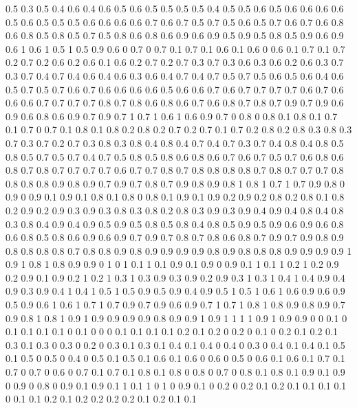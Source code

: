 0.5 0.3
0.5 0.4
0.6 0.4
0.6 0.5
0.6 0.5
0.5 0.5
0.5 0.4
0.5 0.5
0.6 0.5
0.6 0.6
0.6 0.6
0.5 0.6
0.5 0.5
0.5 0.6
0.6 0.6
0.6 0.7
0.6 0.7
0.5 0.7
0.5 0.6
0.5 0.7
0.6 0.7
0.6 0.8
0.6 0.8
0.5 0.8
0.5 0.7
0.5 0.8
0.6 0.8
0.6 0.9
0.6 0.9
0.5 0.9
0.5 0.8
0.5 0.9
0.6 0.9
0.6 1
0.6 1
0.5 1
0.5 0.9
0.6 0
0.7 0
0.7 0.1
0.7 0.1
0.6 0.1
0.6 0
0.6 0.1
0.7 0.1
0.7 0.2
0.7 0.2
0.6 0.2
0.6 0.1
0.6 0.2
0.7 0.2
0.7 0.3
0.7 0.3
0.6 0.3
0.6 0.2
0.6 0.3
0.7 0.3
0.7 0.4
0.7 0.4
0.6 0.4
0.6 0.3
0.6 0.4
0.7 0.4
0.7 0.5
0.7 0.5
0.6 0.5
0.6 0.4
0.6 0.5
0.7 0.5
0.7 0.6
0.7 0.6
0.6 0.6
0.6 0.5
0.6 0.6
0.7 0.6
0.7 0.7
0.7 0.7
0.6 0.7
0.6 0.6
0.6 0.7
0.7 0.7
0.7 0.8
0.7 0.8
0.6 0.8
0.6 0.7
0.6 0.8
0.7 0.8
0.7 0.9
0.7 0.9
0.6 0.9
0.6 0.8
0.6 0.9
0.7 0.9
0.7 1
0.7 1
0.6 1
0.6 0.9
0.7 0
0.8 0
0.8 0.1
0.8 0.1
0.7 0.1
0.7 0
0.7 0.1
0.8 0.1
0.8 0.2
0.8 0.2
0.7 0.2
0.7 0.1
0.7 0.2
0.8 0.2
0.8 0.3
0.8 0.3
0.7 0.3
0.7 0.2
0.7 0.3
0.8 0.3
0.8 0.4
0.8 0.4
0.7 0.4
0.7 0.3
0.7 0.4
0.8 0.4
0.8 0.5
0.8 0.5
0.7 0.5
0.7 0.4
0.7 0.5
0.8 0.5
0.8 0.6
0.8 0.6
0.7 0.6
0.7 0.5
0.7 0.6
0.8 0.6
0.8 0.7
0.8 0.7
0.7 0.7
0.7 0.6
0.7 0.7
0.8 0.7
0.8 0.8
0.8 0.8
0.7 0.8
0.7 0.7
0.7 0.8
0.8 0.8
0.8 0.9
0.8 0.9
0.7 0.9
0.7 0.8
0.7 0.9
0.8 0.9
0.8 1
0.8 1
0.7 1
0.7 0.9
0.8 0
0.9 0
0.9 0.1
0.9 0.1
0.8 0.1
0.8 0
0.8 0.1
0.9 0.1
0.9 0.2
0.9 0.2
0.8 0.2
0.8 0.1
0.8 0.2
0.9 0.2
0.9 0.3
0.9 0.3
0.8 0.3
0.8 0.2
0.8 0.3
0.9 0.3
0.9 0.4
0.9 0.4
0.8 0.4
0.8 0.3
0.8 0.4
0.9 0.4
0.9 0.5
0.9 0.5
0.8 0.5
0.8 0.4
0.8 0.5
0.9 0.5
0.9 0.6
0.9 0.6
0.8 0.6
0.8 0.5
0.8 0.6
0.9 0.6
0.9 0.7
0.9 0.7
0.8 0.7
0.8 0.6
0.8 0.7
0.9 0.7
0.9 0.8
0.9 0.8
0.8 0.8
0.8 0.7
0.8 0.8
0.9 0.8
0.9 0.9
0.9 0.9
0.8 0.9
0.8 0.8
0.8 0.9
0.9 0.9
0.9 1
0.9 1
0.8 1
0.8 0.9
0.9 0
1 0
1 0.1
1 0.1
0.9 0.1
0.9 0
0.9 0.1
1 0.1
1 0.2
1 0.2
0.9 0.2
0.9 0.1
0.9 0.2
1 0.2
1 0.3
1 0.3
0.9 0.3
0.9 0.2
0.9 0.3
1 0.3
1 0.4
1 0.4
0.9 0.4
0.9 0.3
0.9 0.4
1 0.4
1 0.5
1 0.5
0.9 0.5
0.9 0.4
0.9 0.5
1 0.5
1 0.6
1 0.6
0.9 0.6
0.9 0.5
0.9 0.6
1 0.6
1 0.7
1 0.7
0.9 0.7
0.9 0.6
0.9 0.7
1 0.7
1 0.8
1 0.8
0.9 0.8
0.9 0.7
0.9 0.8
1 0.8
1 0.9
1 0.9
0.9 0.9
0.9 0.8
0.9 0.9
1 0.9
1 1
1 1
0.9 1
0.9 0.9
0 0
0.1 0
0.1 0.1
0.1 0.1
0 0.1
0 0
0 0.1
0.1 0.1
0.1 0.2
0.1 0.2
0 0.2
0 0.1
0 0.2
0.1 0.2
0.1 0.3
0.1 0.3
0 0.3
0 0.2
0 0.3
0.1 0.3
0.1 0.4
0.1 0.4
0 0.4
0 0.3
0 0.4
0.1 0.4
0.1 0.5
0.1 0.5
0 0.5
0 0.4
0 0.5
0.1 0.5
0.1 0.6
0.1 0.6
0 0.6
0 0.5
0 0.6
0.1 0.6
0.1 0.7
0.1 0.7
0 0.7
0 0.6
0 0.7
0.1 0.7
0.1 0.8
0.1 0.8
0 0.8
0 0.7
0 0.8
0.1 0.8
0.1 0.9
0.1 0.9
0 0.9
0 0.8
0 0.9
0.1 0.9
0.1 1
0.1 1
0 1
0 0.9
0.1 0
0.2 0
0.2 0.1
0.2 0.1
0.1 0.1
0.1 0
0.1 0.1
0.2 0.1
0.2 0.2
0.2 0.2
0.1 0.2
0.1 0.1
